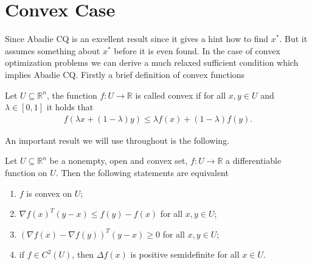 \section{Convex Case}
Since Abadie CQ is an excellent result since it gives a hint how to find
$x^{*}$. But it assumes something about $x^{*}$ before it is even found. In
the case of convex optimization problems we can derive a much relaxed
sufficient condition which implies Abadie CQ. Firstly a brief definition of
convex functions
\begin{definition}
    Let $U \subseteq \mathbb{R}^{n}$, the function $f: U \to \mathbb{R}$
    is called convex if for all $x, y \in U$ and $\lambda \in [0, 1]$ it
    holds that
    \begin{align}
        f(\lambda x + (1-\lambda)y) \le \lambda f(x) + (1-\lambda)f(y).
    \end{align}
\end{definition}
An important result we will use throughout is the following.
\begin{proposition}
    \label{prop: convexity}
    Let $U \subseteq \mathbb{R}^{n}$ be a nonempty, open and convex set, $f:
    U \to \mathbb{R}$ a differentiable function on $U$. Then the following
    statements are equivalent
    \begin{enumerate}
        \item $f$ is convex on $U$;
        \item $\nabla f(x)^{T}(y-x) \le f(y)- f(x)$ for all $x, y \in U$;
        \item $(\nabla f(x) - \nabla f(y))^{T}(y-x)\ge 0$ for all $x, y \in
            U$;
        \item if $f \in C^{2}(U)$, then $\Delta f(x)$ is positive
            semidefinite for all $x \in U$.
    \end{enumerate}
\end{proposition}
